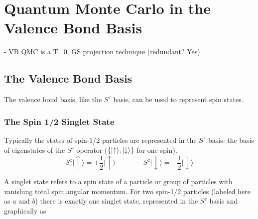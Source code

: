 
\chapter{Quantum Monte Carlo in the Valence Bond Basis}


{\color{red} - VB QMC is a T=0, GS projection technique (redundant? Yes)}
\\
\section{The Valence Bond Basis}

{\color{red} The valence bond basis, like the $S^z$ basis, can be used to represent spin states.}
\subsection{The Spin 1/2 Singlet State}

Typically the states of spin-1/2 particles are represented in the $S^z$ basis: the basis of eigenstates of the $S^z$ operator ($\{\lvert {\uparrow} \rangle,\lvert {\downarrow} \rangle\}$ for one spin).  
\begin{equation}
 	  S^z\lvert \uparrow \rangle = +\frac{1}{2} \lvert \uparrow \rangle
 	 \:\:\:    \:\:\:    \:\:\:    \:\:\:    \:\:\:    \:\:\: 
 	  S^z\lvert \downarrow \rangle = -\frac{1}{2} \lvert \downarrow \rangle
	   \label{SZ}
\end{equation}

A singlet state refers to a spin state of a particle or group of particles with vanishing total spin angular momentum.
For two spin-1/2 particles (labeled here as $a$ and $b$) there is exactly one singlet state, represented in the $S^z$ basis and graphically as


